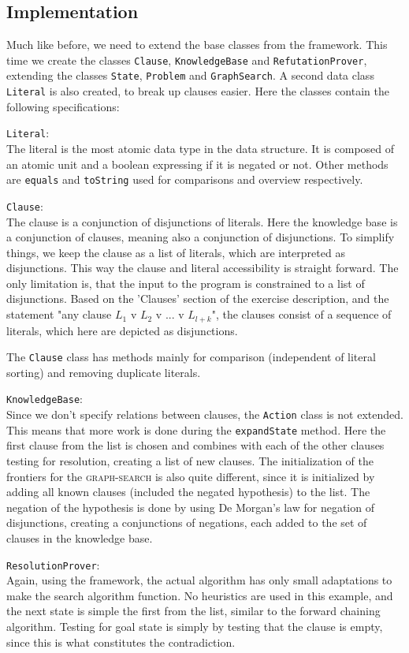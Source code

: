 \subsection{Implementation}

Much like before, we need to extend the base classes from the framework. This time we create the classes \texttt{Clause}, \texttt{KnowledgeBase} and \texttt{RefutationProver}, extending the classes \texttt{State}, \texttt{Problem} and \texttt{GraphSearch}. A second data class \texttt{Literal} is also created, to break up clauses easier. Here the classes contain the following specifications:

\texttt{Literal}: \\
The literal is the most atomic data type in the data structure. It is composed of an atomic unit and a boolean expressing if it is negated or not. Other methods are \texttt{equals} and \texttt{toString} used for comparisons and overview respectively.

\texttt{Clause}: \\
The clause is a conjunction of disjunctions of literals. Here the knowledge base is a conjunction of clauses, meaning also a conjunction of disjunctions. To simplify things, we keep the clause as a list of literals, which are interpreted as disjunctions. This way the clause and literal accessibility is straight forward. The only limitation is, that the input to the program is constrained to a list of disjunctions. Based on the 'Clauses' section of the exercise description, and the statement "any clause $L_1$ v $L_2$ v ... v $L_{l+k}$", the clauses consist of a sequence of literals, which here are depicted as disjunctions. 

The \texttt{Clause} class has methods mainly for comparison (independent of literal sorting) and removing duplicate literals.

\texttt{KnowledgeBase}: \\
Since we don't specify relations between clauses, the \texttt{Action} class is not extended. This means that more work is done during the \texttt{expandState} method. Here the first clause from the list is chosen and combines with each of the other clauses testing for resolution, creating a list of new clauses. The initialization of the frontiers for the \textsc{graph-search} is also quite different, since it is initialized by adding all known clauses (included the negated hypothesis) to the list. The negation of the hypothesis is done by using De Morgan's law for negation of disjunctions, creating a conjunctions of negations, each added to the set of clauses in the knowledge base.

\texttt{ResolutionProver}: \\
Again, using the framework, the actual algorithm has only small adaptations to make the search algorithm function. No heuristics are used in this example, and the next state is simple the first from the list, similar to the forward chaining algorithm. Testing for goal state is simply by testing that the clause is empty, since this is what constitutes the contradiction.